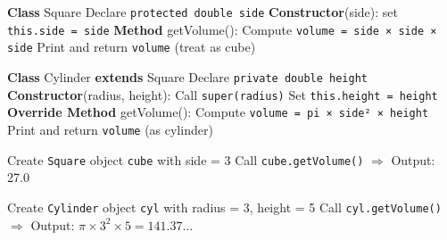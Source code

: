 \begin{algorithm}[H]
\caption{Class \texttt{Square} and \texttt{Cylinder} Definition}
\begin{algorithmic}[1]
\STATE \textbf{Class} Square
\STATE \quad Declare \texttt{protected double side}
\STATE \quad \textbf{Constructor}(side): set \texttt{this.side = side}
\STATE \quad \textbf{Method} getVolume():
\STATE \quad \quad Compute \texttt{volume = side × side × side}
\STATE \quad \quad Print and return \texttt{volume} (treat as cube)

\STATE \textbf{Class} Cylinder \textbf{extends} Square
\STATE \quad Declare \texttt{private double height}
\STATE \quad \textbf{Constructor}(radius, height):
\STATE \quad \quad Call \texttt{super(radius)}
\STATE \quad \quad Set \texttt{this.height = height}
\STATE \quad \textbf{Override Method} getVolume():
\STATE \quad \quad Compute \texttt{volume = pi × side² × height}
\STATE \quad \quad Print and return \texttt{volume} (as cylinder)
\end{algorithmic}
\end{algorithm}

\begin{algorithm}[H]
\caption{Testing Shapes in \texttt{TestShape}}
\begin{algorithmic}[1]
\STATE Create \texttt{Square} object \texttt{cube} with side = 3
\STATE Call \texttt{cube.getVolume()} $\Rightarrow$ Output: 27.0

\STATE Create \texttt{Cylinder} object \texttt{cyl} with radius = 3, height = 5
\STATE Call \texttt{cyl.getVolume()} $\Rightarrow$ Output: $\pi \times 3^2 \times 5 = 141.37\ldots$
\end{algorithmic}
\end{algorithm}
